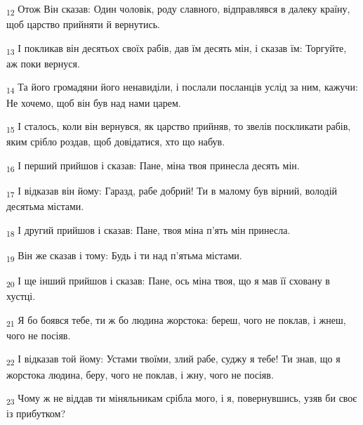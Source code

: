 \begin{tcolorbox}
\textsubscript{12} Отож Він сказав: Один чоловік, роду славного, відправлявся в далеку країну, щоб царство прийняти й вернутись.
\end{tcolorbox}
\begin{tcolorbox}
\textsubscript{13} І покликав він десятьох своїх рабів, дав їм десять мін, і сказав їм: Торгуйте, аж поки вернуся.
\end{tcolorbox}
\begin{tcolorbox}
\textsubscript{14} Та його громадяни його ненавиділи, і послали посланців услід за ним, кажучи: Не хочемо, щоб він був над нами царем.
\end{tcolorbox}
\begin{tcolorbox}
\textsubscript{15} І сталось, коли він вернувся, як царство прийняв, то звелів поскликати рабів, яким срібло роздав, щоб довідатися, хто що набув.
\end{tcolorbox}
\begin{tcolorbox}
\textsubscript{16} І перший прийшов і сказав: Пане, міна твоя принесла десять мін.
\end{tcolorbox}
\begin{tcolorbox}
\textsubscript{17} І відказав він йому: Гаразд, рабе добрий! Ти в малому був вірний, володій десятьма містами.
\end{tcolorbox}
\begin{tcolorbox}
\textsubscript{18} І другий прийшов і сказав: Пане, твоя міна п'ять мін принесла.
\end{tcolorbox}
\begin{tcolorbox}
\textsubscript{19} Він же сказав і тому: Будь і ти над п'ятьма містами.
\end{tcolorbox}
\begin{tcolorbox}
\textsubscript{20} І ще інший прийшов і сказав: Пане, ось міна твоя, що я мав її сховану в хустці.
\end{tcolorbox}
\begin{tcolorbox}
\textsubscript{21} Я бо боявся тебе, ти ж бо людина жорстока: береш, чого не поклав, і жнеш, чого не посіяв.
\end{tcolorbox}
\begin{tcolorbox}
\textsubscript{22} І відказав той йому: Устами твоїми, злий рабе, суджу я тебе! Ти знав, що я жорстока людина, беру, чого не поклав, і жну, чого не посіяв.
\end{tcolorbox}
\begin{tcolorbox}
\textsubscript{23} Чому ж не віддав ти міняльникам срібла мого, і я, повернувшись, узяв би своє із прибутком?
\end{tcolorbox}
